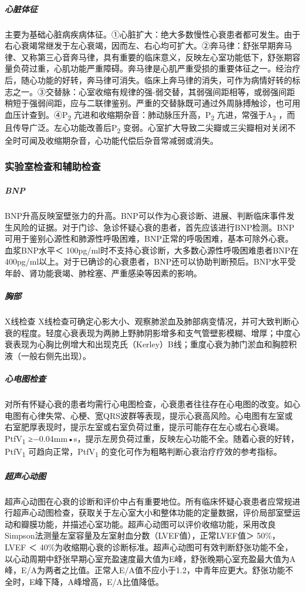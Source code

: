 \subparagraph{心脏体征}

主要为基础心脏病疾病体征。①心脏扩大：绝大多数慢性心衰患者都可发生。由于右心衰竭常继发于左心衰竭，因而左、右心均可扩大。②奔马律：舒张早期奔马律、又称第三心音奔马律，具有重要的临床意义，反映左心室功能低下，舒张期容量负荷过重，心肌功能严重障碍。奔马律是心肌严重受损的重要体征之一。经治疗后，随心功能的好转，奔马律可消失。临床上奔马律的消失，可作为病情好转的标志之一。③交替脉：心室收缩有规律的强-弱交替，其弱强间距相等，或弱强间距稍短于强弱间距，应与二联律鉴别。严重的交替脉既可通过外周脉搏触诊，也可用血压计查到。④P\textsubscript{2}
亢进和收缩期杂音：肺动脉压升高，P\textsubscript{2}
亢进，常强于A\textsubscript{2}
，而且传导广泛。左心功能改善后P\textsubscript{2}
变弱。心室扩大导致二尖瓣或三尖瓣相对关闭不全时可闻及收缩期杂音，心功能代偿后杂音常减弱或消失。

\subsubsection{实验室检查和辅助检查}

\subparagraph{BNP}

BNP升高反映室壁张力的升高。BNP可以作为心衰诊断、进展、判断临床事件发生风险的证据。对于门诊、急诊怀疑心衰的患者，首先应该进行BNP检测。BNP可用于鉴别心源性和肺源性呼吸困难，BNP正常的呼吸困难，基本可除外心衰。血浆BNP水平＜
100pg/ml时不支持心衰诊断，大多数心源性呼吸困难患者BNP在400pg/ml以上。对于已确诊的心衰患者，BNP还可以协助判断预后。BNP水平受年龄、肾功能衰竭、肺栓塞、严重感染等因素的影响。

\subparagraph{胸部}

X线检查
X线检查可确定心影大小、观察肺淤血及肺部病变情况，并可大致判断心衰的程度。轻度心衰表现为两肺上野肺阴影增多和支气管壁影模糊、增厚；中度心衰表现为心胸比例增大和出现克氏（Kerley）B线；重度心衰为肺门淤血和胸腔积液（一般右侧先出现）。

\subparagraph{心电图检查}

对所有怀疑心衰的患者均需行心电图检查，心衰患者往往存在心电图的改变。如心电图有心律失常、心梗、宽QRS波群等表现，提示心衰高风险。心电图有左室或右室肥厚表现时，提示左室或右室负荷过重，提示可能存在左心或右心衰竭。PtfV\textsubscript{1}
≥−0.04mm•s，提示左房负荷过重，反映左心功能不全。随着心衰的好转，PtfV\textsubscript{1}
可趋向正常，PtfV\textsubscript{1}
的变化可作为粗略判断心衰治疗疗效的参考指标。

\subparagraph{超声心动图}

超声心动图在心衰的诊断和评价中占有重要地位。所有临床怀疑心衰患者应常规进行超声心动图检查，获取关于左心室大小和整体功能的定量数据，评价局部室壁运动和瓣膜功能，并描述心室功能。超声心动图可以评价收缩功能，采用改良Simpson法测量左室容量及左室射血分数（LVEF值），正常LVEF值＞
50\%，LVEF ＜
40\%为收缩期心衰的诊断标准。超声心动图可有效判断舒张功能不全，以心动周期中舒张早期心室充盈速度最大值为E峰，舒张晚期心室充盈最大值为A峰，E/A为两者之比值。正常人E/A值不应小于1.2，中青年应更大。舒张功能不全时，E峰下降，A峰增高，E/A比值降低。

